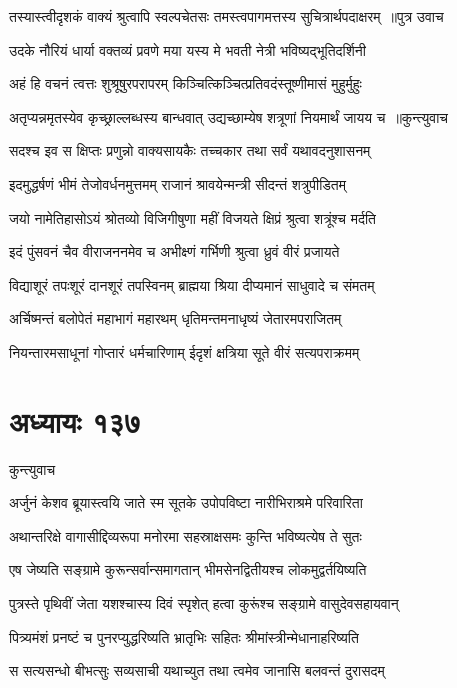 \threelineshloka
{तस्यास्त्वीदृशकं वाक्यं श्रुत्वापि स्वल्पचेतसः}
{तमस्त्वपागमत्तस्य सुचित्रार्थपदाक्षरम् ॥पुत्र उवाच}
{}


\twolineshloka
{उदके नौरियं धार्या वक्तव्यं प्रवणे मया}
{यस्य मे भवती नेत्री भविष्यद्भूतिदर्शिनी}


\twolineshloka
{अहं हि वचनं त्वत्तः शुश्रूषुरपरापरम्}
{किञ्चित्किञ्चित्प्रतिवदंस्तूष्णीमासं मुहुर्मुहुः}


\threelineshloka
{अतृप्यन्नमृतस्येव कृच्छ्राल्लब्धस्य बान्धवात्}
{उद्यच्छाम्येष शत्रूणां नियमार्थं जायय च ॥कुन्त्युवाच}
{}


\twolineshloka
{सदश्च इव स क्षिप्तः प्रणुन्नो वाक्यसायकैः}
{तच्चकार तथा सर्वं यथावदनुशासनम्}


\twolineshloka
{इदमुद्धर्षणं भीमं तेजोवर्धनमुत्तमम्}
{राजानं श्रावयेन्मन्त्री सीदन्तं शत्रुपीडितम्}


\twolineshloka
{जयो नामेतिहासोऽयं श्रोतव्यो विजिगीषुणा}
{महीं विजयते क्षिप्रं श्रुत्वा शत्रूंश्च मर्दति}


\twolineshloka
{इदं पुंसवनं चैव वीराजननमेव च}
{अभीक्ष्णं गर्भिणी श्रुत्वा ध्रुवं वीरं प्रजायते}


\twolineshloka
{विद्याशूरं तपःशूरं दानशूरं तपस्विनम्}
{ब्राह्मया श्रिया दीप्यमानं साधुवादे च संमतम्}


\twolineshloka
{अर्चिष्मन्तं बलोपेतं महाभागं महारथम्}
{धृतिमन्तमनाधृष्यं जेतारमपराजितम्}


\twolineshloka
{नियन्तारमसाधूनां गोप्तारं धर्मचारिणाम्}
{ईदृशं क्षत्रिया सूते वीरं सत्यपराक्रमम्}


\chapter{अध्यायः १३७}
\twolineshloka
{कुन्त्युवाच}
{}


\twolineshloka
{अर्जुनं केशव ब्रूयास्त्वयि जाते स्म सूतके}
{उपोपविष्टा नारीभिराश्रमे परिवारिता}


\threelineshloka
{अथान्तरिक्षे वागासीद्दिव्यरूपा मनोरमा}
{सहस्राक्षसमः कुन्ति भविष्यत्येष ते सुतः}
{}


\twolineshloka
{एष जेष्यति सङ्ग्रामे कुरून्सर्वान्समागतान्}
{भीमसेनद्वितीयश्च लोकमुद्वर्तयिष्यति}


\twolineshloka
{पुत्रस्ते पृथिवीं जेता यशश्चास्य दिवं स्पृशेत्}
{हत्वा कुरूंश्च सङ्ग्रामे वासुदेवसहायवान्}


\twolineshloka
{पित्र्यमंशं प्रनष्टं च पुनरप्युद्धरिष्यति}
{भ्रातृभिः सहितः श्रीमांस्त्रीन्मेधानाहरिष्यति}


\twolineshloka
{स सत्यसन्धो बीभत्सुः सव्यसाची यथाच्युत}
{तथा त्वमेव जानासि बलवन्तं दुरासदम्}


